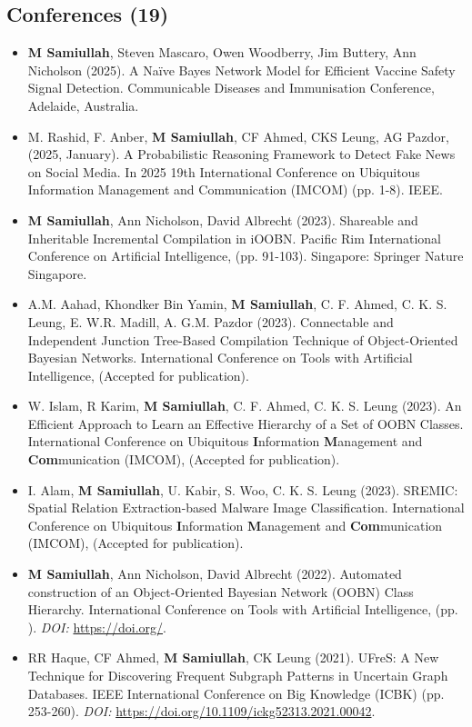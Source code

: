\subsection{Conferences (19)}
\begin{itemize}[noitemsep]
    \item \textbf{M Samiullah}, Steven Mascaro, Owen Woodberry, Jim Buttery, Ann Nicholson (2025). A Naïve Bayes Network Model for Efficient Vaccine Safety Signal Detection. Communicable Diseases and Immunisation Conference, Adelaide, Australia.
    \item M. Rashid, F. Anber, \textbf{M Samiullah}, CF Ahmed, CKS Leung,  AG Pazdor, (2025, January). A Probabilistic Reasoning Framework to Detect Fake News on Social Media. In 2025 19th International Conference on Ubiquitous Information Management and Communication (IMCOM) (pp. 1-8). IEEE.
    \item \textbf{M Samiullah}, Ann Nicholson, David Albrecht (2023). Shareable and Inheritable Incremental Compilation in iOOBN. Pacific Rim International Conference on Artificial Intelligence, (pp. 91-103). Singapore: Springer Nature Singapore.
    \item A.M. Aahad, Khondker Bin Yamin, \textbf{M Samiullah}, C. F. Ahmed, C. K. S. Leung, E. W.R. Madill, A. G.M. Pazdor (2023). Connectable and Independent Junction Tree-Based Compilation Technique of Object-Oriented Bayesian Networks. International Conference on Tools with Artificial Intelligence, (Accepted for publication).
    \item W. Islam, R Karim, \textbf{M Samiullah}, C. F. Ahmed, C. K. S. Leung (2023). An Efficient Approach to Learn an Effective Hierarchy of a Set of OOBN Classes. International Conference on Ubiquitous \textbf{I}nformation \textbf{M}anagement and \textbf{Com}munication (IMCOM), (Accepted for publication).
    \item I. Alam, \textbf{M Samiullah}, U. Kabir, S. Woo, C. K. S. Leung (2023). SREMIC: Spatial Relation Extraction-based Malware Image Classification. International Conference on Ubiquitous \textbf{I}nformation \textbf{M}anagement and \textbf{Com}munication (IMCOM), (Accepted for publication).
    \item \textbf{M Samiullah}, Ann Nicholson, David Albrecht (2022). Automated construction of an Object-Oriented Bayesian Network (OOBN) Class Hierarchy. International Conference on Tools with Artificial Intelligence, (pp. ). {\em DOI:} \url{https://doi.org/}.
    \item RR Haque, CF Ahmed, \textbf{M Samiullah}, CK Leung (2021). UFreS: A New Technique for Discovering Frequent Subgraph Patterns in Uncertain Graph Databases. IEEE International Conference on Big Knowledge (ICBK) (pp. 253-260). {\em DOI:} \url{https://doi.org/10.1109/ickg52313.2021.00042}.

\end{itemize}
